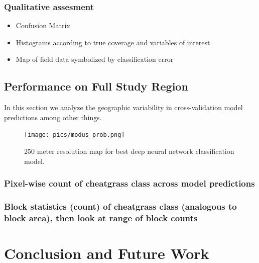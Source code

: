 \def\year{2017}\relax \documentclass[letterpaper]{article}
\begin{document}
\subsubsection{Qualitative assesment}
\begin{itemize}
\item{Confusion Matrix}
\item{Histograms according to true coverage and variables of interest}
\item{Map of field data symbolized by classification error}
\end{itemize}
\subsection{Performance on Full Study Region}
In this section we analyze the geographic variability in cross-validation model predictions among other things.
\begin{figure}
\texttt{[image: pics/modus\_prob.png]}
\caption{250 meter resolution map for best deep neural network classification model.}\label{250m}
\end{figure}
\subsubsection{Pixel-wise count of cheatgrass class across model predictions}
\subsubsection{Block statistics (count) of cheatgrass class (analogous to block area), then look at range of block counts}
\section{Conclusion and Future Work}


\end{document}
